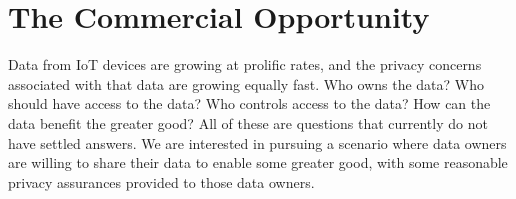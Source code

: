 \section{The Commercial Opportunity}
\label{sec:opportunity}

%

Data from IoT devices are growing at prolific rates, and the privacy concerns
associated with that data are growing equally fast. 
 Who owns the data? Who
should have access to the data? Who controls access to the data? How can
the data benefit the greater good? All of these are questions that currently
do not have settled answers.  We are interested in pursuing a scenario
where data owners are willing to share their data to enable some greater
good, with some reasonable privacy assurances provided to those data owners.

